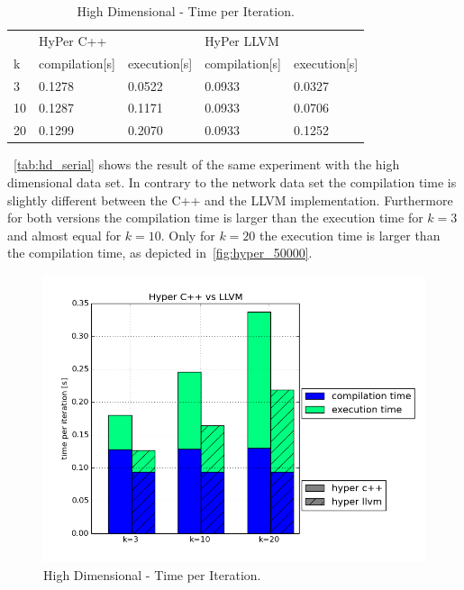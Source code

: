 \begin{table}[htsb]
  \caption[High Dimensional - Time per Iteration]{High Dimensional - Time per Iteration.}\label{tab:hd_serial}
  \centering
  \begin{tabular}{l l l l l}
    \toprule
      & HyPer C++ & & HyPer LLVM & \\
      k & compilation[s] & execution[s] & compilation[s] & execution[s] \\
    \midrule
      3  & 0.1278 & 0.0522 & 0.0933 & 0.0327 \\
      10 & 0.1287 & 0.1171 & 0.0933 & 0.0706 \\
      20 & 0.1299 & 0.2070 & 0.0933 & 0.1252 \\
    \bottomrule
  \end{tabular}
\end{table}

~\autoref{tab:hd_serial} shows the result of the same experiment with the high dimensional data set. In contrary to the network data set the compilation time is slightly different between the C++ and the LLVM implementation. Furthermore for both versions the compilation time is larger than the execution time for $k = 3$ and almost equal for $k = 10$. Only for $k = 20$ the execution time is larger than the compilation time, as depicted in~\autoref{fig:hyper_50000}.

\begin{figure}[htsb]
  \centering
  \includegraphics[scale=0.4, trim="0cm 1.5cm 0cm 0cm"]{figures/charts/hyper_50000}
  \caption[High Dimensional - Time per Iteration]{High Dimensional - Time per Iteration.}
  \label{fig:hyper_50000}
\end{figure}


